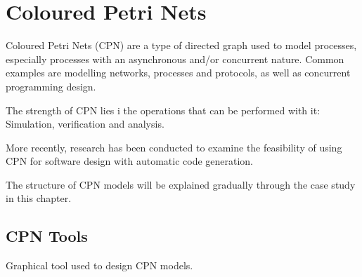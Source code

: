 \section{Coloured Petri Nets}

Coloured Petri Nets (CPN) are a type of directed graph used to model processes,
especially processes with an asynchronous and/or concurrent nature. Common
examples are modelling networks, processes and protocols, as well as
concurrent programming design.

The strength of CPN lies i the operations that can be performed with it:
Simulation, verification and analysis. 

More recently, research has been conducted to examine the feasibility of using
CPN for software design with automatic code generation.

The structure of CPN models will be explained gradually through the case study
in this chapter.

\subsection{CPN Tools}

Graphical tool used to design CPN models. 

\begin{comment}

\subsection{CPN ML}
	


		
		The simple types available are unit, boolean, integer, string, enumerated
		and index. A unit can have one value: |()|. Enumerated colour sets
		can have specified values, while index colour sets define an indexed range of
		values. 
		
		The compound types are:
		\begin{description}
		\item[Product] A combination of colour sets separated by |*|. The
		postal code and city example from earlier would be
		|product INT*STRING|, and a token would be (5055,''Bergen'');
		\item[List] A list of items that belong to the same colour set.
		\item[Record] Similar to a product, but each element is named. The postal code
		and city example would give \lstinline-record Code:INT*City:STRING- and a
		token would be |{Code=5055,City="Bergen"}|
		\item[Union] This is used if a place should be able to contain tokens from
		different colour sets, or if such tokens should be handled in the same way at a
		point in the model. They can also contain simple identifiers, like an
		enumeration. An example is shown in Listing \ref{lst:overview_colset}.
		\end{description}
		
		For full syntax definition, please refer to the CPN Tools
		documentation. (ref?)

\end{comment}
